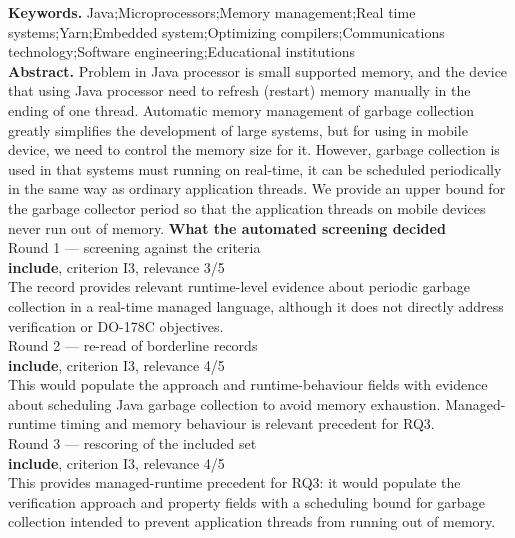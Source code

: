 \documentclass[11pt,a4paper]{article}
\begin{document}
{\small\textbf{Keywords.} Java;Microprocessors;Memory management;Real time systems;Yarn;Embedded system;Optimizing compilers;Communications technology;Software engineering;Educational institutions}\\[2mm]
{\small\textbf{Abstract.} Problem in Java processor is small supported memory, and the device that using Java processor need to refresh (restart) memory manually in the ending of one thread. Automatic memory management of garbage collection greatly simplifies the development of large systems, but for using in mobile device, we need to control the memory size for it. However, garbage collection is used in that systems must running on real-time, it can be scheduled periodically in the same way as ordinary application threads. We provide an upper bound for the garbage collector period so that the application threads on mobile devices never run out of memory.}
\vspace{3mm}
\vspace{2.5mm}
{\small\textbf{What the automated screening decided}}\\[2mm]
{\footnotesize\color{soft}Round 1 --- screening against the criteria}\\[0.5mm]
{\small\textbf{include}, criterion I3, relevance 3/5}\\[0.5mm]
{\small The record provides relevant runtime-level evidence about periodic garbage collection in a real-time managed language, although it does not directly address verification or DO-178C objectives.}\\[2.5mm]
{\footnotesize\color{soft}Round 2 --- re-read of borderline records}\\[0.5mm]
{\small\textbf{include}, criterion I3, relevance 4/5}\\[0.5mm]
{\small This would populate the approach and runtime-behaviour fields with evidence about scheduling Java garbage collection to avoid memory exhaustion. Managed-runtime timing and memory behaviour is relevant precedent for RQ3.}\\[2.5mm]
{\footnotesize\color{soft}Round 3 --- rescoring of the included set}\\[0.5mm]
{\small\textbf{include}, criterion I3, relevance 4/5}\\[0.5mm]
{\small This provides managed-runtime precedent for RQ3: it would populate the verification approach and property fields with a scheduling bound for garbage collection intended to prevent application threads from running out of memory.}\\[2.5mm]
\end{document}
